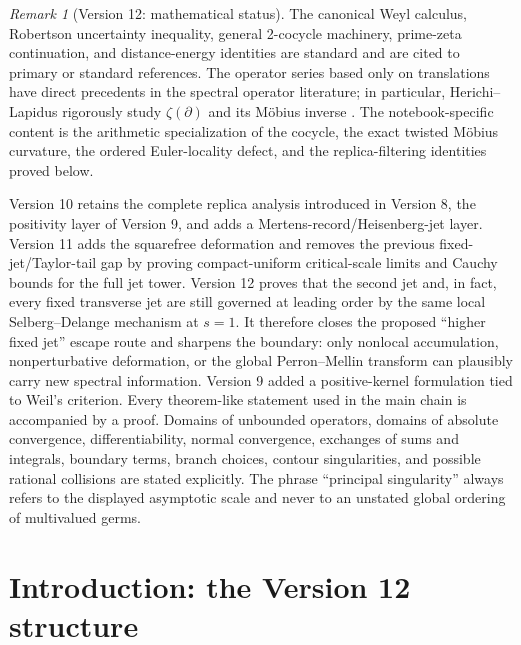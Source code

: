 \documentclass[11pt]{amsart}
\numberwithin{equation}{section}
\theoremstyle{plain}
\theoremstyle{definition}
\theoremstyle{remark}
\newtheorem{remark}[theorem]{Remark}
\begin{document}
\maketitle

\tableofcontents

\bigskip

\begin{remark}[Version 12: mathematical status]
\label{rem:status}
The canonical Weyl calculus, Robertson uncertainty inequality, general
2-cocycle machinery, prime-zeta continuation, and distance-energy identities
are standard and are cited to primary or standard references.  The operator
series based only on translations have direct precedents in the spectral
operator literature; in particular, Herichi--Lapidus rigorously study
\(\zeta(\partial)\) and its M\"obius inverse
\cite{HerichiLapidus2014}.  The notebook-specific content is the arithmetic
specialization of the cocycle, the exact twisted M\"obius curvature, the
ordered Euler-locality defect, and the replica-filtering identities proved
below.

Version 10 retains the complete replica analysis introduced in Version 8, the positivity layer of Version 9, and adds a Mertens-record/Heisenberg-jet layer.  Version 11 adds the squarefree deformation and removes the
previous fixed-jet/Taylor-tail gap by proving compact-uniform critical-scale
limits and Cauchy bounds for the full jet tower.  Version 12 proves that the
second jet and, in fact, every fixed transverse jet are still governed at
leading order by the same local Selberg--Delange mechanism at \(s=1\).  It
therefore closes the proposed ``higher fixed jet'' escape route and sharpens
the boundary: only nonlocal accumulation, nonperturbative deformation, or the
global Perron--Mellin transform can plausibly carry new spectral information.
Version 9 added a positive-kernel formulation tied to Weil's criterion.  Every theorem-like statement used in the main chain is
accompanied by a proof.  Domains of unbounded operators, domains of absolute
convergence, differentiability, normal convergence, exchanges of sums and
integrals, boundary terms, branch choices, contour singularities, and possible
rational collisions are stated explicitly.  The phrase ``principal
singularity'' always refers to the displayed asymptotic scale and never to an
unstated global ordering of multivalued germs.
\end{remark}

\section{Introduction: the Version 12 structure}
\label{sec:introduction}
\end{document}
